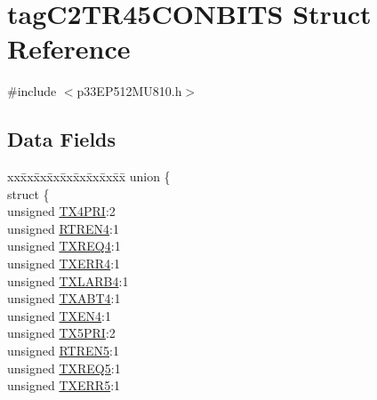 \hypertarget{structtag_c2_t_r45_c_o_n_b_i_t_s}{}\section{tag\+C2\+T\+R45\+C\+O\+N\+B\+I\+TS Struct Reference}
\label{structtag_c2_t_r45_c_o_n_b_i_t_s}


{\ttfamily \#include $<$p33\+E\+P512\+M\+U810.\+h$>$}

\subsection*{Data Fields}
\begin{DoxyCompactItemize}
\item 
\begin{tabbing}
xx\=xx\=xx\=xx\=xx\=xx\=xx\=xx\=xx\=\kill
union \{\\
\>struct \{\\
\>\>unsigned \hyperlink{structtag_c2_t_r45_c_o_n_b_i_t_s_aa6a3ee143c244d8467173cdc1a992e38}{TX4PRI}:2\\
\>\>unsigned \hyperlink{structtag_c2_t_r45_c_o_n_b_i_t_s_a6821840feab6970b1d70407f2e085551}{RTREN4}:1\\
\>\>unsigned \hyperlink{structtag_c2_t_r45_c_o_n_b_i_t_s_adf240a43f250ec1a7e61ad9e8b9a8ffc}{TXREQ4}:1\\
\>\>unsigned \hyperlink{structtag_c2_t_r45_c_o_n_b_i_t_s_aeb970a99d6cdd83ddbc7fba3158ea609}{TXERR4}:1\\
\>\>unsigned \hyperlink{structtag_c2_t_r45_c_o_n_b_i_t_s_a20d182e6218696116b9b3b9ef02f5b29}{TXLARB4}:1\\
\>\>unsigned \hyperlink{structtag_c2_t_r45_c_o_n_b_i_t_s_ae5a87ed6b4b9f0a65971312ef28e08b4}{TXABT4}:1\\
\>\>unsigned \hyperlink{structtag_c2_t_r45_c_o_n_b_i_t_s_a0e6f0b5f915a779257b109817ea4832b}{TXEN4}:1\\
\>\>unsigned \hyperlink{structtag_c2_t_r45_c_o_n_b_i_t_s_aa448f4e4890ce5c63e40547679abea9e}{TX5PRI}:2\\
\>\>unsigned \hyperlink{structtag_c2_t_r45_c_o_n_b_i_t_s_a935e79e3658a0008f27ca776bbf0419c}{RTREN5}:1\\
\>\>unsigned \hyperlink{structtag_c2_t_r45_c_o_n_b_i_t_s_a9ad70609ad3034a380a9fa1ad06e7d17}{TXREQ5}:1\\
\>\>unsigned \hyperlink{structtag_c2_t_r45_c_o_n_b_i_t_s_ac5fd698af5ab6b21b802527453c0c117}{TXERR5}:1\\

\end{tabbing}
\end{DoxyCompactItemize}
